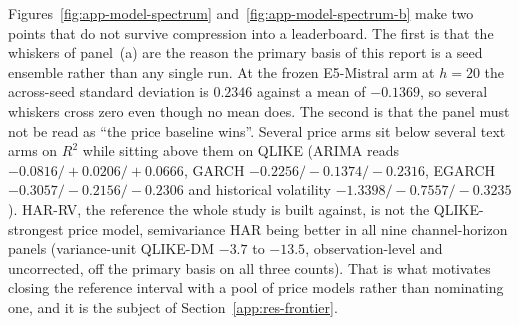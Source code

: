 Figures~\ref{fig:app-model-spectrum} and~\ref{fig:app-model-spectrum-b} make two points that do not survive
compression into a leaderboard. The first is that the whiskers of panel~(a)
are the reason the primary basis of this report is a seed ensemble rather than
any single run. At the frozen E5-Mistral arm at $h=20$ the across-seed
standard deviation is $0.2346$ against a mean of $-0.1369$, so several
whiskers cross zero even though no mean does. %
The second is that the panel must not be read as ``the price baseline wins''.
Several price arms sit below several text arms on $R^2$ while sitting above
them on QLIKE (ARIMA reads $-0.0816/+0.0206/+0.0666$, GARCH
$-0.2256/-0.1374/-0.2316$, EGARCH $-0.3057/-0.2156/-0.2306$ and historical
volatility $-1.3398/-0.7557/-0.3235$). %
HAR-RV, the reference the whole
study is built against, is not the QLIKE-strongest price model, semivariance
HAR being better in all nine channel-horizon panels (variance-unit QLIKE-DM $-3.7$ to $-13.5$, observation-level and uncorrected, off the primary basis on all three counts). %
That is what motivates closing the reference interval with a pool of price
models rather than nominating one, and it is the subject of
Section~\ref{app:res-frontier}.


